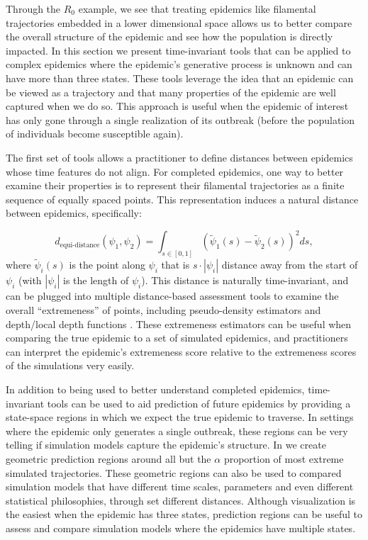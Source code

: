 \documentclass[
  shortnames]{jss}
\begin{document}
Through the \(R_0\) example, we see that treating epidemics like
filamental trajectories embedded in a lower dimensional space allows us
to better compare the overall structure of the epidemic and see how the
population is directly impacted. In this section we present
time-invariant tools that can be applied to complex epidemics where the
epidemic's generative process is unknown and can have more than three
states. These tools leverage the idea that an epidemic can be viewed as
a trajectory and that many properties of the epidemic are well captured
when we do so. This approach is useful when the epidemic of interest has
only gone through a single realization of its outbreak (before the
population of individuals become susceptible again).

The first set of tools allows a practitioner to define distances between
epidemics whose time features do not align. For completed epidemics, one
way to better examine their properties is to represent their filamental
trajectories as a finite sequence of equally spaced points. This
representation induces a natural distance between epidemics,
specifically:

\[
d_\text{equi-distance}(\psi_1, \psi_2)  = \int_{s \in [0,1]} (\tilde{\psi}_1(s) - \tilde{\psi}_2(s))^2 ds \nonumber,
\] where \(\tilde{\psi}_i(s)\) is the point along \(\psi_i\) that is
\(s\cdot|\psi_i|\) distance away from the start of \(\psi_i\) (with
\(|\psi_i|\) is the length of \(\psi_i\)). This distance is naturally
time-invariant, and can be plugged into multiple distance-based
assessment tools to examine the overall ``extremeness'' of points,
including pseudo-density estimators and depth/local depth functions
\citep[for examples see][]{Ciollaro2016, Geenens2017}. These extremeness
estimators can be useful when comparing the true epidemic to a set of
simulated epidemics, and practitioners can interpret the epidemic's
extremeness score relative to the extremeness scores of the simulations
very easily.

In addition to being used to better understand completed epidemics,
time-invariant tools can be used to aid prediction of future epidemics
by providing a state-space regions in which we expect the true epidemic
to traverse. In settings where the epidemic only generates a single
outbreak, these regions can be very telling if simulation models capture
the epidemic's structure. In  we create geometric
prediction regions around all but the \(\alpha\) proportion of most
extreme simulated trajectories. These geometric regions can also be used
to compared simulation models that have different time scales,
parameters and even different statistical philosophies, through set
different distances. Although visualization is the easiest when the
epidemic has three states, prediction regions can be useful to assess
and compare simulation models where the epidemics have multiple states.
\end{document}
